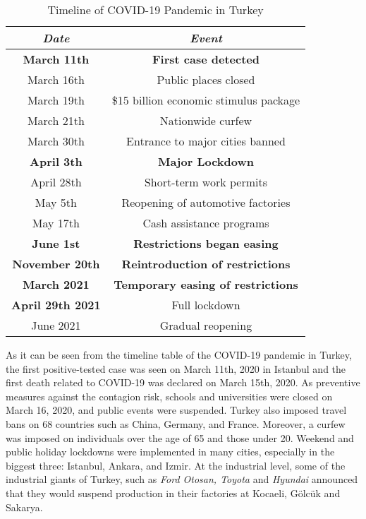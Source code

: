 \documentclass[a4paper,12pt]{article}
\begin{document}
    \begin{frame}
    \scriptsize 
    \begin{table}[H]
        \centering
        \begin{tabular}{|c|c|}
            \hline
            \textit{Date}   & \textit{Event} \\ \hline
            \textbf{March 11th}    &  \textbf{First case detected} \\ \hline
            March 16th    & Public places closed \\ \hline
            March 19th    & \$15 billion economic stimulus package \\ \hline
            March 21th    & Nationwide curfew \\ \hline
            March 30th    & Entrance to major cities banned \\ \hline
            \textbf{April 3th} & \textbf{Major Lockdown} \\ \hline
            April 28th   & Short-term work permits \\ \hline
            May 5th    & Reopening of automotive factories \\ \hline
            May 17th    & Cash assistance programs \\ \hline
            \textbf{June 1st}   & \textbf{Restrictions began easing} \\ \hline
            \textbf{November 20th} & \textbf{Reintroduction of restrictions} \\ \hline
            \textbf{March 2021} & \textbf{Temporary easing of restrictions} \\ \hline
            \textbf{April 29th 2021 }   & Full lockdown \\ \hline
            June 2021    & Gradual reopening \\ \hline
        \end{tabular}
        \caption{Timeline of COVID-19 Pandemic in Turkey}
        \label{tab:timeline}
    \end{table}
\end{frame}


    \indent As it can be seen from the timeline table of the COVID-19 pandemic in Turkey, the first positive-tested case was seen on March 11th, 2020 in Istanbul and the first death related to COVID-19 was declared on March 15th, 2020. As preventive measures against the contagion risk, schools and universities were closed on March 16, 2020, and public events were suspended. Turkey also imposed travel bans on 68 countries such as China, Germany, and France. Moreover, a curfew was imposed on individuals over the age of 65 and those under 20. Weekend and public holiday lockdowns were implemented in many cities, especially in the biggest three: Istanbul, Ankara, and Izmir. At the industrial level, some of the industrial giants of Turkey, such as \textit{Ford Otosan, Toyota} and \textit{Hyundai} announced that they would suspend production in their factories at Kocaeli, Gölcük and Sakarya.
\end{document}
